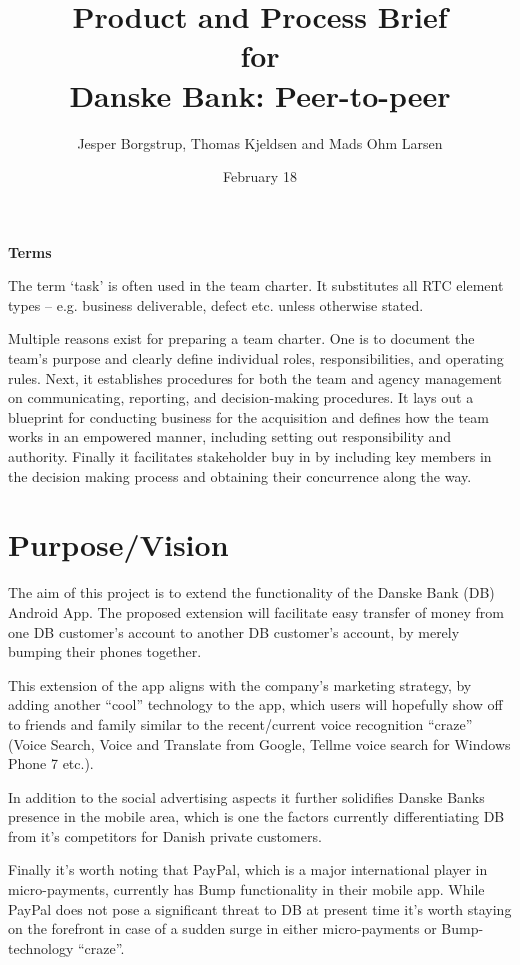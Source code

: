 \documentclass[a4paper,11pt]{article}
\title{Product and Process Brief\\\small{for}\\\small{Danske Bank: Peer-to-peer}}
\author{ Jesper Borgstrup, Thomas Kjeldsen and Mads Ohm Larsen }
\date{February 18}
\begin{document}
\ifpdf
{}
\else
{}
\fi

\maketitle

\tableofcontents
\vspace{2cm}

\noindent\textbf{Terms}

The term ‘task’ is often used in the team charter. 
It substitutes all RTC element types – e.g. business deliverable, defect etc. unless otherwise stated.

\pagebreak
Multiple reasons exist for preparing a team charter. One is to document the team’s purpose and clearly define individual roles, responsibilities, and operating rules. Next, it establishes procedures for both the team and agency management on communicating, reporting, and decision-making procedures. It lays out a blueprint for conducting business for the acquisition and defines how the team works in an empowered manner, including setting out responsibility and authority. Finally it facilitates stakeholder buy in by including key members in the decision making process and obtaining their concurrence along the way. 

\section{Purpose/Vision} %
\label{sec:purpose_vision}

The aim of this project is to extend the functionality of the Danske Bank (DB) Android App. The proposed extension will facilitate easy transfer of money from one DB customer's account to another DB customer's account, by merely bumping their phones together.

This extension of the app aligns with the company's marketing strategy, by adding another ``cool'' technology to the app, which users will hopefully show off to friends and family similar to the recent/current voice recognition ``craze'' (Voice Search, Voice and Translate from Google, Tellme voice search for Windows Phone 7 etc.).

In addition to the social advertising aspects it further solidifies Danske Banks presence in the mobile area, which is one the factors currently differentiating DB from it's competitors for Danish private customers. 

Finally it's worth noting that PayPal, which is a major international player in micro-payments, currently has Bump functionality in their mobile app. While PayPal does not pose a significant threat to DB at present time it's worth staying on the forefront in case of a sudden surge in either micro-payments or Bump-technology ``craze''.
\end{document}
